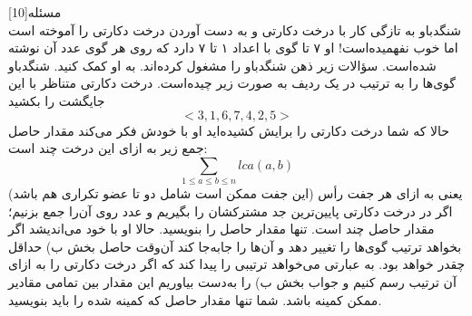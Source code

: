 ‌مسئله[10]
\\
شنگدباو به تازگی کار با درخت دکارتی و به دست آوردن درخت دکارتی را آموخته است اما خوب نفهمیده‌است! او ۷ تا گوی با اعداد ۱ تا ۷ دارد که روی هر گوی عدد آن نوشته شده‌است. سؤالات زیر ذهن شنگدباو را مشغول کرده‌اند. به او کمک کنید.
شنگدباو گوی‌ها را به ترتیب در یک ردیف به صورت زیر چیده‌است. درخت دکارتی متناظر با این جایگشت را بکشید
$$<3, 1, 6, 7, 4, 2, 5>$$
حالا که شما درخت دکارتی را برایش کشیده‌اید او با خودش فکر می‌کند مقدار حاصل جمع زیر به ازای این درخت چند است:
$$\sum_{1 \le a \le b \le n} lca(a,b)$$
یعنی به ازای هر جفت رأس (این جفت ممکن است شامل دو تا عضو تکراری هم باشد) اگر در درخت دکارتی پایین‌ترین جد مشترکشان را بگیریم و عدد روی آن‌را جمع بزنیم؛ مقدار حاصل چند است. تنها مقدار حاصل را بنویسید.
حالا او با خود می‌اندیشد اگر بخواهد ترتیب گوی‌ها را تغییر دهد و آن‌ها را جابه‌جا کند آن‌وقت حاصل بخش ب) حداقل چقدر خواهد بود. به عبارتی می‌خواهد ترتیبی را پیدا کند که اگر درخت دکارتی را به ازای آن ترتیب رسم کنیم و جواب بخش ب) را به‌دست بیاوریم این مقدار بین تمامی مقادیر ممکن کمینه باشد. شما تنها مقدار حاصل که کمینه شده را باید بنویسید.









